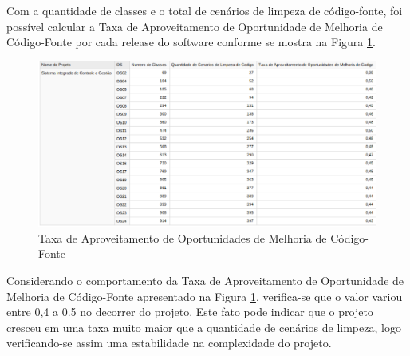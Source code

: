 Com a quantidade de classes e o total de cenários de limpeza de código-fonte, foi possível calcular a Taxa de Aproveitamento de Oportunidade de Melhoria de Código-Fonte por cada release do software conforme se mostra na Figura \ref{fig:taxa-cenarios}.

\begin{figure}[H]
\centering
\includegraphics[keepaspectratio=true,scale=0.38]{figuras/taxa-parcial.eps}
\caption{Taxa de Aproveitamento de Oportunidades de Melhoria de Código-Fonte}
\label{fig:taxa-cenarios}
\end{figure}
\FloatBarrier


Considerando o comportamento da Taxa de Aproveitamento de Oportunidade de Melhoria de Código-Fonte apresentado na Figura \ref{fig:taxa-cenarios}, verifica-se que o valor variou entre 0,4 a 0.5 no decorrer do projeto. Este fato pode indicar que o projeto cresceu em uma taxa muito maior que a quantidade de cenários de limpeza, logo verificando-se assim uma estabilidade na complexidade do projeto.

